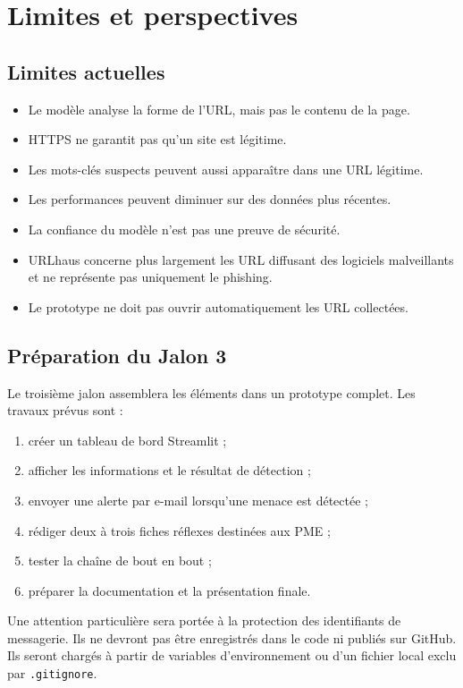 \documentclass[11pt,a4paper]{report}
\begin{document}
\chapter{Limites et perspectives}

\section{Limites actuelles}

\begin{itemize}
  \item Le modèle analyse la forme de l'URL, mais pas le contenu de la page.
  \item HTTPS ne garantit pas qu'un site est légitime.
  \item Les mots-clés suspects peuvent aussi apparaître dans une URL légitime.
  \item Les performances peuvent diminuer sur des données plus récentes.
  \item La confiance du modèle n'est pas une preuve de sécurité.
  \item URLhaus concerne plus largement les URL diffusant des logiciels
        malveillants et ne représente pas uniquement le phishing.
  \item Le prototype ne doit pas ouvrir automatiquement les URL collectées.
\end{itemize}

\section{Préparation du Jalon 3}

Le troisième jalon assemblera les éléments dans un prototype complet. Les
travaux prévus sont :

\begin{enumerate}
  \item créer un tableau de bord Streamlit ;
  \item afficher les informations et le résultat de détection ;
  \item envoyer une alerte par e-mail lorsqu'une menace est détectée ;
  \item rédiger deux à trois fiches réflexes destinées aux PME ;
  \item tester la chaîne de bout en bout ;
  \item préparer la documentation et la présentation finale.
\end{enumerate}

Une attention particulière sera portée à la protection des identifiants de
messagerie. Ils ne devront pas être enregistrés dans le code ni publiés sur
GitHub. Ils seront chargés à partir de variables d'environnement ou d'un
fichier local exclu par \texttt{.gitignore}.
\end{document}
